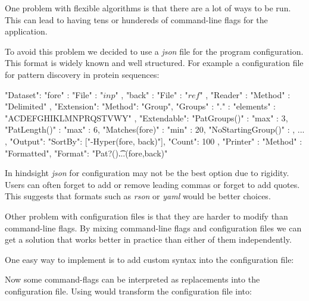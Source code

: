 One problem with flexible algorithms is that there are a lot of ways to be run. This can lead to having tens or hundereds of command-line flags for the application.

To avoid this problem we decided to use a \emph{json} file for the program configuration. This format is widely known and well structured. For example a configuration file for pattern discovery in protein sequences:

\begin{file}
{
    "Dataset": {
        "fore" : { "File" : "$inp$" },
        "back" : { "File" : "$ref$" }
    },
    "Reader" : {
        "Method" : "Delimited"
    },
    "Extension": {
        "Method": "Group",
        "Groups" : {
            "." : { "elements" : "ACDEFGHIKLMNPRQSTVWY"}
        },
        "Extendable": {
            "PatGroups()" : {"max" : 3},
            "PatLength()" : {"max" : 6},
            "Matches(fore)" : {"min" : 20},
            "NoStartingGroup()" : {}
        },
        ...
    },
    "Output": {
        "SortBy": ["-Hyper(fore, back)"],
        "Count": 100
    },
    "Printer" : {
        "Method" : "Formatted",
        "Format": "Pat?()\t...\tHyper(fore,back)\n"
    }
}
\end{file}

In hindsight \emph{json} for configuration may not be the best option due to rigidity. Users can often forget to add or remove leading commas or forget to add quotes. This suggests that formats such as \emph{rson} or \emph{yaml} would be better choices.

Other problem with configuration files is that they are harder to modify than command-line flags. By mixing command-line flags and configuration files we can get a solution that works better in practice than either of them independently.

One easy way to implement is to add custom syntax into the configuration file:

\begin{file}
"Datasets" : {
    "fore" : { "File" : "$argument:default$"
    ...
\end{file}

Now some command-flags can be interpreted as replacements into the configuration file. Using  would transform the configuration file into:

\begin{file}
"Datasets" : {
    "fore" : { "File" : "other"
    ...
\end{file}

